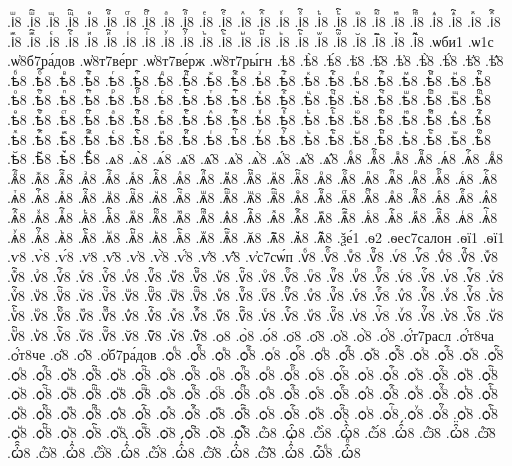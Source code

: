 {.іⷲ8
.іⷲ҇8
.іⷳ8
.іⷳ҇8
.іⷴ8
.іⷴ҇8
.іⷵ8
.іⷵ҇8
.іⷶ8
.іⷶ҇8
.іⷷ8
.іⷷ҇8
.іⷸ8
.іⷸ҇8
.іⷹ8
.іⷹ҇8
.іⷺ8
.іⷺ҇8
.іⷻ8
.іⷻ҇8
.іⷼ8
.іⷼ҇8
.іⷽ8
.іⷽ҇8
.іⷾ8
.іⷾ҇8
.іⷿ8
.іⷿ҇8
.іꙴ8
.іꙴ҇8
.іꙵ8
.іꙵ҇8
.іꙶ8
.іꙶ҇8
.іꙷ8
.іꙷ҇8
.іꙸ8
.іꙸ҇8
.іꙹ8
.іꙹ҇8
.іꙺ8
.іꙺ҇8
.іꙻ8
.іꙻ҇8
.і꙼8
.і꙼҇8
.і꙽8
.і꙽҇8
.ѡби1
.ѡ1с
.ѡ҆8б7ра́дов
.ѡ҆8т7ве́рг
.ѡ҆8т7ве́рж
.ѡ҆8т7ры́гн
.ѣ8
.ѣ̀8
.ѣ́8
.ѣ̈8
.ѣ̑8
.ѣ҆8
.ѣ҆̀8
.ѣ҆́8
.ѣ҆̈8
.ѣ҆̑8
.ѣⷠ8
.ѣⷠ҇8
.ѣⷡ8
.ѣⷡ҇8
.ѣⷢ8
.ѣⷢ҇8
.ѣⷣ8
.ѣⷣ҇8
.ѣⷤ8
.ѣⷤ҇8
.ѣⷥ8
.ѣⷥ҇8
.ѣⷦ8
.ѣⷦ҇8
.ѣⷧ8
.ѣⷧ҇8
.ѣⷨ8
.ѣⷨ҇8
.ѣⷩ8
.ѣⷩ҇8
.ѣⷪ8
.ѣⷪ҇8
.ѣⷫ8
.ѣⷫ҇8
.ѣⷬ8
.ѣⷬ҇8
.ѣⷭ8
.ѣⷭ҇8
.ѣⷮ8
.ѣⷮ҇8
.ѣⷯ8
.ѣⷯ҇8
.ѣⷰ8
.ѣⷰ҇8
.ѣⷱ8
.ѣⷱ҇8
.ѣⷲ8
.ѣⷲ҇8
.ѣⷳ8
.ѣⷳ҇8
.ѣⷴ8
.ѣⷴ҇8
.ѣⷵ8
.ѣⷵ҇8
.ѣⷶ8
.ѣⷶ҇8
.ѣⷷ8
.ѣⷷ҇8
.ѣⷸ8
.ѣⷸ҇8
.ѣⷹ8
.ѣⷹ҇8
.ѣⷺ8
.ѣⷺ҇8
.ѣⷻ8
.ѣⷻ҇8
.ѣⷼ8
.ѣⷼ҇8
.ѣⷽ8
.ѣⷽ҇8
.ѣⷾ8
.ѣⷾ҇8
.ѣⷿ8
.ѣⷿ҇8
.ѣꙴ8
.ѣꙴ҇8
.ѣꙵ8
.ѣꙵ҇8
.ѣꙶ8
.ѣꙶ҇8
.ѣꙷ8
.ѣꙷ҇8
.ѣꙸ8
.ѣꙸ҇8
.ѣꙹ8
.ѣꙹ҇8
.ѣꙺ8
.ѣꙺ҇8
.ѣꙻ8
.ѣꙻ҇8
.ѣ꙼8
.ѣ꙼҇8
.ѣ꙽8
.ѣ꙽҇8
.ѧ8
.ѧ̀8
.ѧ́8
.ѧ̈8
.ѧ̑8
.ѧ҆8
.ѧ҆̀8
.ѧ҆́8
.ѧ҆̈8
.ѧ҆̑8
.ѧⷠ8
.ѧⷠ҇8
.ѧⷡ8
.ѧⷡ҇8
.ѧⷢ8
.ѧⷢ҇8
.ѧⷣ8
.ѧⷣ҇8
.ѧⷤ8
.ѧⷤ҇8
.ѧⷥ8
.ѧⷥ҇8
.ѧⷦ8
.ѧⷦ҇8
.ѧⷧ8
.ѧⷧ҇8
.ѧⷨ8
.ѧⷨ҇8
.ѧⷩ8
.ѧⷩ҇8
.ѧⷪ8
.ѧⷪ҇8
.ѧⷫ8
.ѧⷫ҇8
.ѧⷬ8
.ѧⷬ҇8
.ѧⷭ8
.ѧⷭ҇8
.ѧⷮ8
.ѧⷮ҇8
.ѧⷯ8
.ѧⷯ҇8
.ѧⷰ8
.ѧⷰ҇8
.ѧⷱ8
.ѧⷱ҇8
.ѧⷲ8
.ѧⷲ҇8
.ѧⷳ8
.ѧⷳ҇8
.ѧⷴ8
.ѧⷴ҇8
.ѧⷵ8
.ѧⷵ҇8
.ѧⷶ8
.ѧⷶ҇8
.ѧⷷ8
.ѧⷷ҇8
.ѧⷸ8
.ѧⷸ҇8
.ѧⷹ8
.ѧⷹ҇8
.ѧⷺ8
.ѧⷺ҇8
.ѧⷻ8
.ѧⷻ҇8
.ѧⷼ8
.ѧⷼ҇8
.ѧⷽ8
.ѧⷽ҇8
.ѧⷾ8
.ѧⷾ҇8
.ѧⷿ8
.ѧⷿ҇8
.ѧꙴ8
.ѧꙴ҇8
.ѧꙵ8
.ѧꙵ҇8
.ѧꙶ8
.ѧꙶ҇8
.ѧꙷ8
.ѧꙷ҇8
.ѧꙸ8
.ѧꙸ҇8
.ѧꙹ8
.ѧꙹ҇8
.ѧꙺ8
.ѧꙺ҇8
.ѧꙻ8
.ѧꙻ҇8
.ѧ꙼8
.ѧ꙼҇8
.ѧ꙽8
.ѧ꙽҇8
.ѯе́1
.ѳ2
.ѳес7салон
.ѳї1
.ѳї1
.ѵ8
.ѵ̀8
.ѵ́8
.ѵ̈8
.ѵ̑8
.ѵ҆8
.ѵ҆̀8
.ѵ҆́8
.ѵ҆̈8
.ѵ҆̑8
.ѵ҆с7сѡ́п
.ѵⷠ8
.ѵⷠ҇8
.ѵⷡ8
.ѵⷡ҇8
.ѵⷢ8
.ѵⷢ҇8
.ѵⷣ8
.ѵⷣ҇8
.ѵⷤ8
.ѵⷤ҇8
.ѵⷥ8
.ѵⷥ҇8
.ѵⷦ8
.ѵⷦ҇8
.ѵⷧ8
.ѵⷧ҇8
.ѵⷨ8
.ѵⷨ҇8
.ѵⷩ8
.ѵⷩ҇8
.ѵⷪ8
.ѵⷪ҇8
.ѵⷫ8
.ѵⷫ҇8
.ѵⷬ8
.ѵⷬ҇8
.ѵⷭ8
.ѵⷭ҇8
.ѵⷮ8
.ѵⷮ҇8
.ѵⷯ8
.ѵⷯ҇8
.ѵⷰ8
.ѵⷰ҇8
.ѵⷱ8
.ѵⷱ҇8
.ѵⷲ8
.ѵⷲ҇8
.ѵⷳ8
.ѵⷳ҇8
.ѵⷴ8
.ѵⷴ҇8
.ѵⷵ8
.ѵⷵ҇8
.ѵⷶ8
.ѵⷶ҇8
.ѵⷷ8
.ѵⷷ҇8
.ѵⷸ8
.ѵⷸ҇8
.ѵⷹ8
.ѵⷹ҇8
.ѵⷺ8
.ѵⷺ҇8
.ѵⷻ8
.ѵⷻ҇8
.ѵⷼ8
.ѵⷼ҇8
.ѵⷽ8
.ѵⷽ҇8
.ѵⷾ8
.ѵⷾ҇8
.ѵⷿ8
.ѵⷿ҇8
.ѵꙴ8
.ѵꙴ҇8
.ѵꙵ8
.ѵꙵ҇8
.ѵꙶ8
.ѵꙶ҇8
.ѵꙷ8
.ѵꙷ҇8
.ѵꙸ8
.ѵꙸ҇8
.ѵꙹ8
.ѵꙹ҇8
.ѵꙺ8
.ѵꙺ҇8
.ѵꙻ8
.ѵꙻ҇8
.ѵ꙼8
.ѵ꙼҇8
.ѵ꙽8
.ѵ꙽҇8
.ѻ8
.ѻ̀8
.ѻ́8
.ѻ̈8
.ѻ̑8
.ѻ҆8
.ѻ҆̀8
.ѻ҆́8
.ѻ҆́т7расл
.ѻ҆́т8ча
.ѻ҆́т8че
.ѻ҆̈8
.ѻ҆̑8
.ѻ҆б7ра́дов
.ѻⷠ8
.ѻⷠ҇8
.ѻⷡ8
.ѻⷡ҇8
.ѻⷢ8
.ѻⷢ҇8
.ѻⷣ8
.ѻⷣ҇8
.ѻⷤ8
.ѻⷤ҇8
.ѻⷥ8
.ѻⷥ҇8
.ѻⷦ8
.ѻⷦ҇8
.ѻⷧ8
.ѻⷧ҇8
.ѻⷨ8
.ѻⷨ҇8
.ѻⷩ8
.ѻⷩ҇8
.ѻⷪ8
.ѻⷪ҇8
.ѻⷫ8
.ѻⷫ҇8
.ѻⷬ8
.ѻⷬ҇8
.ѻⷭ8
.ѻⷭ҇8
.ѻⷮ8
.ѻⷮ҇8
.ѻⷯ8
.ѻⷯ҇8
.ѻⷰ8
.ѻⷰ҇8
.ѻⷱ8
.ѻⷱ҇8
.ѻⷲ8
.ѻⷲ҇8
.ѻⷳ8
.ѻⷳ҇8
.ѻⷴ8
.ѻⷴ҇8
.ѻⷵ8
.ѻⷵ҇8
.ѻⷶ8
.ѻⷶ҇8
.ѻⷷ8
.ѻⷷ҇8
.ѻⷸ8
.ѻⷸ҇8
.ѻⷹ8
.ѻⷹ҇8
.ѻⷺ8
.ѻⷺ҇8
.ѻⷻ8
.ѻⷻ҇8
.ѻⷼ8
.ѻⷼ҇8
.ѻⷽ8
.ѻⷽ҇8
.ѻⷾ8
.ѻⷾ҇8
.ѻⷿ8
.ѻⷿ҇8
.ѻꙴ8
.ѻꙴ҇8
.ѻꙵ8
.ѻꙵ҇8
.ѻꙶ8
.ѻꙶ҇8
.ѻꙷ8
.ѻꙷ҇8
.ѻꙸ8
.ѻꙸ҇8
.ѻꙹ8
.ѻꙹ҇8
.ѻꙺ8
.ѻꙺ҇8
.ѻꙻ8
.ѻꙻ҇8
.ѻ꙼8
.ѻ꙼҇8
.ѻ꙽8
.ѻ꙽҇8
.ѽ8
.ꙍ҆̑8
.ѽ̀8
.ꙍ҆̑̀8
.ѽ́8
.ꙍ҆̑́8
.ѽ̈8
.ꙍ҆̑̈8
.ѽ̑8
.ꙍ҆̑̑8
.ѽ҆8
.ꙍ҆̑҆8
.ѽ҆̀8
.ꙍ҆̑҆̀8
.ѽ҆́8
.ꙍ҆̑҆́8
.ѽ҆̈8
.ꙍ҆̑҆̈8
.ѽ҆̑8
.ꙍ҆̑҆̑8
.ѽⷠ8
.ꙍ҆̑ⷠ8
}
